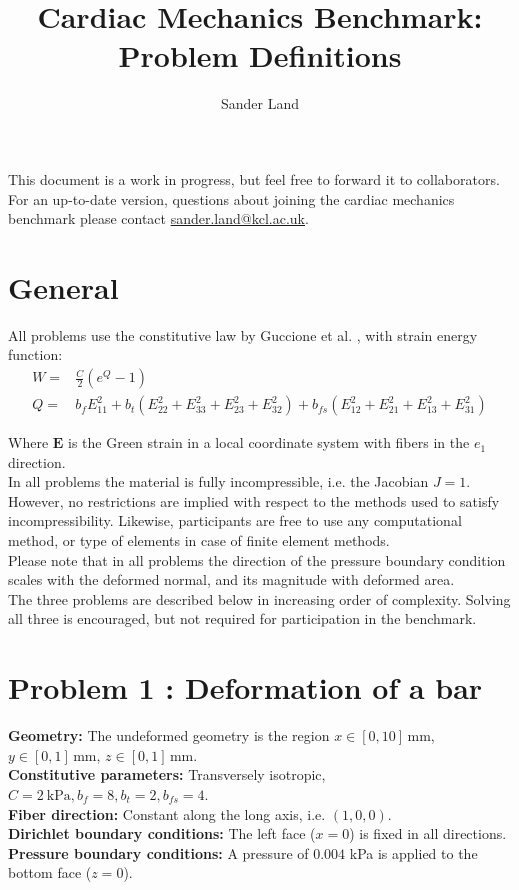 \documentclass[a4paper,10pt]{article}
\title{Cardiac Mechanics Benchmark: Problem Definitions}
\author{Sander Land}
\newcommand{\mm}{\,\text{mm}}
\begin{document}
\maketitle

\appendix

\noindent This document is a work in progress, but feel free to forward it to collaborators.
For an up-to-date version, questions about joining the cardiac mechanics benchmark please contact \url{sander.land@kcl.ac.uk}.

\section{General}

All problems use the constitutive law by Guccione et al. \cite{guccione_finite_1995}, with strain energy function:
\begin{align}
W   =& \frac{C}{2} (e^Q - 1)  \\
Q   =&     b_f E_{11}^2 + b_t (E_{22}^2 + E_{33}^2 + E_{23}^2+ E_{32}^2) + b_{fs} (E_{12}^2 + E_{21}^2 + E_{13}^2 + E_{31}^2)
\end{align}

Where $\mathbf{E}$ is the Green strain in a local coordinate system with fibers in the $e_1$ direction.\\

In all problems the material is fully incompressible, i.e. the Jacobian $J=1$.
However, no restrictions are implied with respect to the methods used to satisfy incompressibility. %
Likewise, participants are free to use any computational method, or type of elements in case of finite element methods.\\

Please note that in all problems the direction of the pressure boundary condition scales with the deformed normal, and its magnitude with deformed area.\\

The three problems are described below in increasing order of complexity. Solving all three is encouraged, but not required for participation in the benchmark.

\section{Problem 1 : Deformation of a bar}

\textbf{Geometry:} 
 The undeformed geometry is the region $x \in [0,10]\mm$, $y \in [0,1]\mm$, $z \in [0,1]\mm$.\\
\textbf{Constitutive parameters:} Transversely isotropic, $C=2~\text{kPa}, b_f=8, b_t=2, b_{fs}=4$.\\
\textbf{Fiber direction:} Constant along the long axis, i.e. $(1,0,0)$.\\
\textbf{Dirichlet boundary conditions:}
 The left face ($x=0$) is fixed in all directions.\\
\textbf{Pressure boundary conditions:}
 A pressure of $0.004$ kPa is applied to the bottom face ($z=0$).
 
\end{document}
